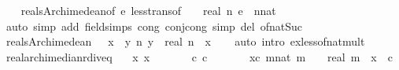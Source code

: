 \begin{isabellebody}
%
\isadelimproof
\ \ %
\endisadelimproof
%
\isatagproof
{}\isamarkupfalse%
\ reals{\isacharunderscore}{\kern0pt}Archimedean{\isacharbrackleft}{\kern0pt}of\ e{\isacharbrackright}{\kern0pt}\ less{\isacharunderscore}{\kern0pt}trans{\isacharbrackleft}{\kern0pt}of\ {}\ {\isachardoublequoteopen}{}\ {\isacharslash}{\kern0pt}\ real\ n{\isachardoublequoteclose}\ e\ \ n{\isacharcolon}{\kern0pt}{\isacharcolon}{\kern0pt}nat{\isacharbrackright}{\kern0pt}\isanewline
\ \ \isamarkupfalse%
\ {\isacharparenleft}{\kern0pt}auto\ simp\ add{\isacharcolon}{\kern0pt}\ field{\isacharunderscore}{\kern0pt}simps\ cong{\isacharcolon}{\kern0pt}\ conj{\isacharunderscore}{\kern0pt}cong\ simp\ del{\isacharcolon}{\kern0pt}\ of{\isacharunderscore}{\kern0pt}nat{\isacharunderscore}{\kern0pt}Suc{\isacharparenright}{\kern0pt}%
\endisatagproof
{\isafoldproof}%
%
\isadelimproof
\isanewline
%
\endisadelimproof
\isanewline
{}\isamarkupfalse%
\ reals{\isacharunderscore}{\kern0pt}Archimedean{}{\isacharcolon}{\kern0pt}\ {\isachardoublequoteopen}{}\ {\isacharless}{\kern0pt}\ x\ {\isasymLongrightarrow}\ {\isasymforall}y{\isachardot}{\kern0pt}\ {\isasymexists}n{\isachardot}{\kern0pt}\ y\ {\isacharless}{\kern0pt}\ real\ n\ {\isacharasterisk}{\kern0pt}\ x{\isachardoublequoteclose}\isanewline
%
\isadelimproof
\ \ %
\endisadelimproof
%
\isatagproof
{}\isamarkupfalse%
\ {\isacharparenleft}{\kern0pt}auto\ intro{\isacharcolon}{\kern0pt}\ ex{\isacharunderscore}{\kern0pt}less{\isacharunderscore}{\kern0pt}of{\isacharunderscore}{\kern0pt}nat{\isacharunderscore}{\kern0pt}mult{\isacharparenright}{\kern0pt}%
\endisatagproof
{\isafoldproof}%
%
\isadelimproof
\isanewline
%
\endisadelimproof
\isanewline
{}\isamarkupfalse%
\ real{\isacharunderscore}{\kern0pt}archimedian{\isacharunderscore}{\kern0pt}rdiv{\isacharunderscore}{\kern0pt}eq{\isacharunderscore}{\kern0pt}{}{\isacharcolon}{\kern0pt}\isanewline
\ \ \ x{}{\isacharcolon}{\kern0pt}\ {\isachardoublequoteopen}x\ {\isasymge}\ {}{\isachardoublequoteclose}\isanewline
\ \ \ \ \ c{\isacharcolon}{\kern0pt}\ {\isachardoublequoteopen}c\ {\isasymge}\ {}{\isachardoublequoteclose}\isanewline
\ \ \ \ \ xc{\isacharcolon}{\kern0pt}\ {\isachardoublequoteopen}{\isasymAnd}m{\isacharcolon}{\kern0pt}{\isacharcolon}{\kern0pt}nat{\isachardot}{\kern0pt}\ m\ {\isachargreater}{\kern0pt}\ {}\ {\isasymLongrightarrow}\ real\ m\ {\isacharasterisk}{\kern0pt}\ x\ {\isasymle}\ c{\isachardoublequoteclose}\isanewline

\end{isabellebody}
